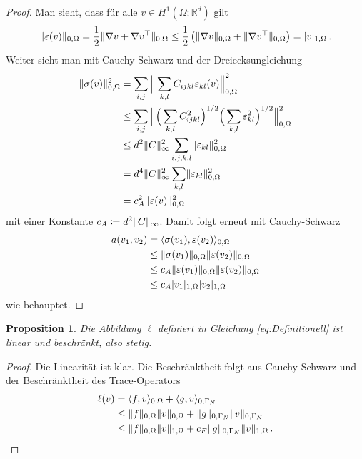 \documentclass{scrartcl}
\newcounter{everything}
\newtheorem{proposition}[everything]{Proposition}
\def\R{\mathbb{R}}
\def\e{\varepsilon}
\DeclarePairedDelimiter{\abs}{\lvert}{\rvert}
\DeclarePairedDelimiter{\inner}{\langle}{\rangle}
\DeclarePairedDelimiter{\norm}{\lVert}{\rVert}
\begin{document}
\begin{proof}
	Man sieht, dass für alle $v\in H^1(\Omega;\R^d)$ gilt
	\begin{align}
		\norm{\e(v)}_{0,\Omega}
		= \frac{1}{2}\norm{\nabla v+\nabla v^\top}_{0,\Omega} 
		\leq \frac{1}{2}\left(\norm{\nabla v}_{0,\Omega}+\norm{\nabla v^\top}_{0,\Omega}\right) 
		= \abs{v}_{1,\Omega} \,.\label{eq:continuityEpsilonNorm}
	\end{align}
	Weiter sieht man mit Cauchy-Schwarz und der Dreiecksungleichung
	\begin{align}
		\begin{aligned}
		\norm{\sigma(v)}_{0,\Omega}^2
		&= \sum_{i,j}\Big\lVert\sum_{k,l}C_{ijkl}\e_{kl}(v)\Big\rVert_{0,\Omega}^2 \\
		&\leq \sum_{i,j}\Big\lVert\Big(\sum_{k,l}C_{ijkl}^2\Big)^{1/2}\Big(\sum_{k,l}\e_{kl}^2\Big)^{1/2}\Big\rVert_{0,\Omega}^2 \\
		&\leq d^2\norm{C}_\infty^2\sum_{i,j,k,l}\norm{\e_{kl}}_{0,\Omega}^2 \\
		&= d^4\norm{C}_\infty^2\sum_{k,l}\norm{\e_{kl}}_{0,\Omega}^2 \\
		&= c_A^2\norm{\e(v)}_{0,\Omega}^2
		\end{aligned}
		\label{eq:ContinuityOfSigma}
	\end{align}
	mit einer Konstante $c_A\coloneqq d^2\norm{C}_\infty$.
	Damit folgt erneut mit Cauchy-Schwarz
	\begin{align*}
		a(v_1,v_2) &= 
		\inner{\sigma(v_1),\e(v_2)}_{0,\Omega} \\
		&\leq \norm{\sigma(v_1)}_{0,\Omega}\norm{\e(v_2)}_{0,\Omega} \\
		&\leq c_A\norm{\e(v_1)}_{0,\Omega}\norm{\e(v_2)}_{0,\Omega} \\
		&\leq c_A\abs{v_1}_{1,\Omega}\abs{v_2}_{1,\Omega}
	\end{align*}
	wie behauptet.
\end{proof}
\begin{proposition}\label{pr:stetigkeitell}
Die Abbildung $\ell$ definiert in Gleichung \eqref{eq:Definitionell} ist linear und beschränkt, also stetig.
\end{proposition}
\begin{proof}
	Die Linearität ist klar. Die Beschränktheit folgt aus Cauchy-Schwarz und der Beschränktheit des Trace-Operators
	\begin{align*}
		\ell(v)&=\inner{f,v}_{0,\Omega}+\inner{g,v}_{0,\Gamma_N} \\
		&\leq \norm{f}_{0,\Omega}\norm{v}_{0,\Omega}+\norm{g}_{0,\Gamma_N}\norm{v}_{0,\Gamma_N} \\
		&\leq \norm{f}_{0,\Omega}\norm{v}_{1,\Omega}+c_F\norm{g}_{0,\Gamma_N}\norm{v}_{1,\Omega}\,.
	\end{align*}
\end{proof}
\end{document}
